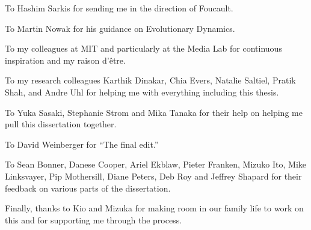 To Hashim Sarkis for sending me in the direction of Foucault.

To Martin Nowak for his guidance on Evolutionary Dynamics.

To my colleagues at MIT and particularly at the Media Lab for continuous inspiration and my raison d'être.

To my research colleagues Karthik Dinakar, Chia Evers, Natalie Saltiel, Pratik Shah, and Andre Uhl for helping me with everything including this thesis.

To Yuka Sasaki, Stephanie Strom and Mika Tanaka for their help on helping me pull this dissertation together.

To David Weinberger for ``The final edit.''

To Sean Bonner, Danese Cooper, Ariel Ekblaw, Pieter Franken, Mizuko Ito, Mike Linksvayer, Pip Mothersill, Diane Peters, Deb Roy and Jeffrey Shapard for their feedback on various parts of the dissertation.

Finally, thanks to Kio and Mizuka for making room in our family life to work on this and for supporting me through the process.\\



\endgroup